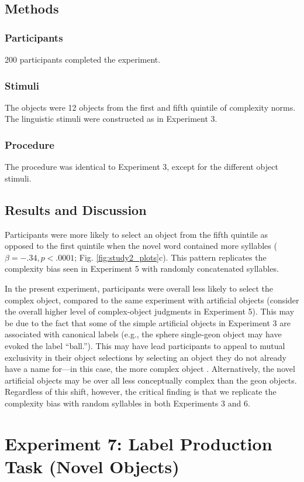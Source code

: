 \documentclass[man]{apa2}
\begin{document}
\subsection{Methods}
\subsubsection{Participants} 200 participants completed the experiment. 
\subsubsection{Stimuli} The objects were 12 objects from the first and fifth quintile of complexity norms. The linguistic stimuli were constructed as in Experiment 3. 

\subsubsection{Procedure}
The procedure was identical to Experiment 3, except for the different object stimuli.

\subsection{Results and Discussion}
Participants were more likely to select an object from the fifth quintile as opposed to the first quintile when the novel word contained more syllables ($\beta = -.34, p < .0001$; Fig. \ref{fig:study2_plots}c). This pattern replicates the complexity bias seen in Experiment 5 with randomly concatenated syllables. 

In the present experiment, participants were overall less likely to select the complex object, compared to the same experiment with artificial objects (consider the overall higher level of complex-object judgments in Experiment 5). This may be due to the fact that some of the simple artificial objects in Experiment 3 are associated with canonical labels (e.g., the sphere single-geon object may have evoked the label ``ball.''). This may have lead participants to appeal to mutual exclusivity in their object selections by selecting an object they do not already have a name for---in this case, the more complex object \cite{markman1988}. Alternatively, the novel artificial objects may be over all less conceptually complex than the geon objects. Regardless of this shift, however, the critical finding is that we replicate the complexity bias with random syllables in both Experiments 3 and 6.

\section{Experiment 7: Label Production Task (Novel Objects)}
\end{document}
